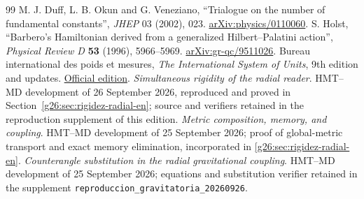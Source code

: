 \begin{thebibliography}{99}
 M. J. Duff, L. B. Okun and G. Veneziano, ``Trialogue on the number of fundamental constants'', \emph{JHEP} 03 (2002), 023. \href{https://arxiv.org/abs/physics/0110060}{arXiv:physics/0110060}.
 S. Holst, ``Barbero's Hamiltonian derived from a generalized Hilbert--Palatini action'', \emph{Physical Review D} \textbf{53} (1996), 5966--5969. \href{https://arxiv.org/abs/gr-qc/9511026}{arXiv:gr-qc/9511026}.
 Bureau international des poids et mesures, \emph{The International System of Units}, 9th edition and updates. \href{https://www.bipm.org/en/publications/si-brochure}{Official edition}.
 \emph{Simultaneous rigidity of the radial reader}.
HMT--MD development of 26 September 2026, reproduced and proved in
Section~\ref{g26:sec:rigidez-radial-en}; source and verifiers retained
in the reproduction supplement of this edition.
 \emph{Metric composition, memory, and coupling}.
HMT--MD development of 25 September 2026; proof of global-metric
transport and exact memory elimination, incorporated in
\ref{g26:sec:rigidez-radial-en}.
 \emph{Counterangle substitution in the radial
gravitational coupling}. HMT--MD development of 25 September 2026;
equations and substitution verifier retained in the supplement
\texttt{reproduccion\_gravitatoria\_20260926}.
\end{thebibliography}
